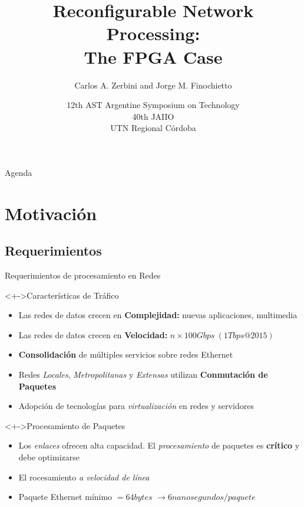 \documentclass[xcolor=dvipsnames]{beamer}
\title[Reconfigurable Network Processing: The FPGA Case] {Reconfigurable Network Processing: \\ The FPGA Case}
\author[Carlos A. Zerbini and Jorge M. Finochietto] {Carlos A. Zerbini and Jorge M. Finochietto}
\institute[Universidades] %
{
  \scriptsize Laboratorio de Comunicaciones Digitales \\
  \scriptsize Universidad Nacional de Córdoba, Facultad Ciencias Exactas, Físicas y Naturales \\
  \vskip2ex
  \scriptsize Departamento de Ingeniería Electrónica \\
  \scriptsize Universidad Tecnológica Nacional, Facultad Regional Córdoba \\
}
\date[12th AST Argentine Symposium on Technology]
{\scriptsize 12th AST Argentine Symposium on Technology \\ 40th JAIIO \\ UTN Regional Córdoba}
\begin{document}
\begin{frame}
  \titlepage
\end{frame}

\begin{frame}{Agenda}
  \tableofcontents
\end{frame}

\scriptsize

\section{Motivación}

\subsection{Requerimientos}

\begin{frame}{Requerimientos de procesamiento en Redes}
  \scriptsize
  
  \begin{block}<+->{Características de Tráfico}

    \begin{itemize}
      \item Las redes de datos crecen en {\bf Complejidad:} nuevas aplicaciones, multimedia

      \item Las redes de datos crecen en {\bf Velocidad:} $n \times 100 Gbps\ (1Tbps@2015)$

      \item {\bf Consolidación} de múltiples servicios sobre redes Ethernet
      
      \item Redes \emph{Locales}, \emph{Metropolitanas} y \emph{Extensas} utilizan {\bf Conmutación de Paquetes}

      \item Adopción de tecnologías para \emph{virtualización} en redes y servidores
    \end{itemize}
    
  \end{block}
    
  \begin{block}<+->{Procesamiento de Paquetes}
    \begin{itemize}

      \item Los \emph{enlaces} ofrecen alta capacidad. El \emph{procesamiento} de paquetes es {\bf crítico} y debe optimizarse

      \item El rocesamiento \emph{a velocidad de línea}

      \item Paquete Ethernet mínimo $=64 bytes$ $\rightarrow 6 nanosegundos/paquete$  
    \end{itemize}    
  \end{block}

\end{frame}
\end{document}
